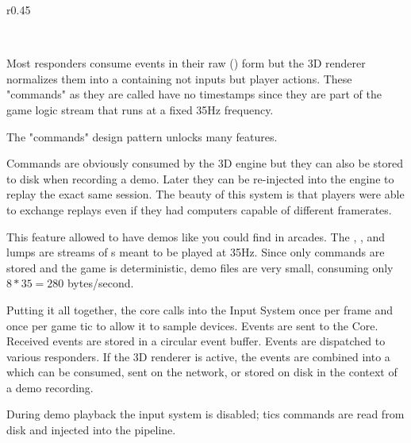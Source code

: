 \begin{wrapfigure}[12]{r}{0.45\textwidth}
\centering
{}
\end{wrapfigure}
\\
\par
Most responders consume events in their raw () form but the 3D renderer normalizes them into a  containing not inputs but player actions. These "commands" as they are called have no timestamps since they are part of the game logic stream that runs at a fixed 35Hz frequency. \\
\par
{} \label{cmd_t_type}
\par
The "commands" design pattern unlocks many features. \\
\par
Commands are obviously consumed by the 3D engine but they can also be stored to disk when recording a demo. Later they can be re-injected into the engine to replay the exact same session. The beauty of this system is that players were able to exchange replays even if they had computers capable of different framerates.\\
\par
This feature allowed \doom{} to have demos like you could find in arcades. The , , and  lumps are streams of s meant to be played at 35Hz. Since only commands are stored and the game is deterministic, demo files are very small, consuming only $ 8 * 35 = 280 $ bytes/second.\\

\par
Putting it all together,  the core calls into the Input System once per frame and once per game tic to allow it to sample devices.  Events are sent to the Core.  Received events are stored in a circular event buffer.  Events are dispatched to various responders. If the 3D renderer is active, the events are combined into a  which can be consumed, sent on the network, or stored on disk in the context of a demo recording.\\
\par
 During demo playback the input system is disabled; tics commands are read from disk and injected into the pipeline.
